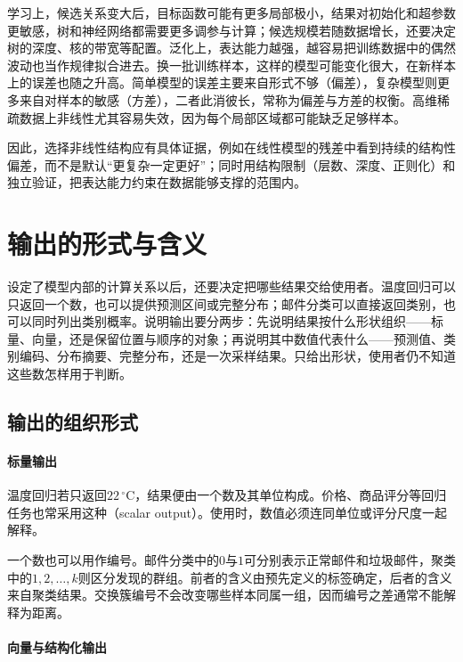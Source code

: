 学习上，候选关系变大后，目标函数可能有更多局部极小，结果对初始化和超参数更敏感，树和神经网络都需要更多调参与计算；候选规模若随数据增长，还要决定树的深度、核的带宽等配置。泛化上，表达能力越强，越容易把训练数据中的偶然波动也当作规律拟合进去。换一批训练样本，这样的模型可能变化很大，在新样本上的误差也随之升高。简单模型的误差主要来自形式不够（偏差），复杂模型则更多来自对样本的敏感（方差），二者此消彼长，常称为偏差与方差的权衡。高维稀疏数据上非线性尤其容易失效，因为每个局部区域都可能缺乏足够样本。

因此，选择非线性结构应有具体证据，例如在线性模型的残差中看到持续的结构性偏差，而不是默认“更复杂一定更好”；同时用结构限制（层数、深度、正则化）和独立验证，把表达能力约束在数据能够支撑的范围内。

\FloatBarrier
\section{输出的形式与含义}
\label{sec:models-output}

设定了模型内部的计算关系以后，还要决定把哪些结果交给使用者。温度回归可以只返回一个数，也可以提供预测区间或完整分布；邮件分类可以直接返回类别，也可以同时列出类别概率。说明输出要分两步：先说明结果按什么形状组织——标量、向量，还是保留位置与顺序的对象；再说明其中数值代表什么——预测值、类别编码、分布摘要、完整分布，还是一次采样结果。只给出形状，使用者仍不知道这些数怎样用于判断。

\subsection{输出的组织形式}
\label{sec:models-output-form}

\paragraph{标量输出}
\label{sec:models-scalar-output}

温度回归若只返回$22\,^{\circ}\mathrm{C}$，结果便由一个数及其单位构成。价格、商品评分等回归任务也常采用这种（scalar output）。使用时，数值必须连同单位或评分尺度一起解释。

一个数也可以用作编号。邮件分类中的$0$与$1$可分别表示正常邮件和垃圾邮件，聚类中的$1,2,\ldots,k$则区分发现的群组。前者的含义由预先定义的标签确定，后者的含义来自聚类结果。交换簇编号不会改变哪些样本同属一组，因而编号之差通常不能解释为距离。

\paragraph{向量与结构化输出}
\label{sec:models-vector-output}

